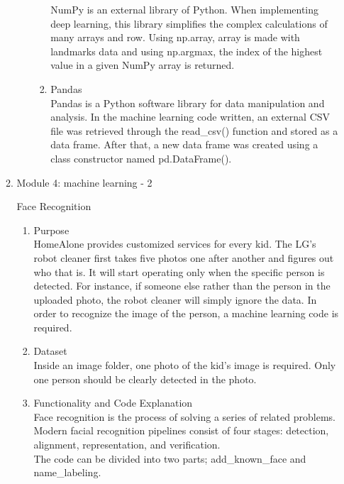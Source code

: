 \documentclass[conference]{IEEEtran}
\begin{document}
\begin{enumerate}[label=\arabic*.]
\begin{enumerate}[label=\arabic*.]
\begin{enumerate}[label=\alph*.]
\begin{enumerate}[label=\roman*.]
            NumPy is an external library of Python. When implementing deep learning, this library simplifies the complex calculations of many arrays and row. Using np.array, array is made with landmarks data and using np.argmax, the index of the highest value in a given NumPy array is returned. \\
            \item{\large{Pandas}}\\ 
            Pandas is a Python software library for data manipulation and analysis. In the machine learning code written, an external CSV file was retrieved through the read\_csv() function and stored as a data frame. After that, a new data frame was created using a class constructor named pd.DataFrame(). \\
        \end{enumerate}
    \end{enumerate}
    \item {\large{Module 4: machine learning - 2}} \\
    \begin{center}\large{Face Recognition}\\\end{center} 
    \begin{enumerate}[label=\alph*.]
        \item{\large{Purpose}}\\
        HomeAlone provides customized services for every kid. The LG’s robot cleaner first takes five photos one after another and figures out who that is. It will start operating only when the specific person is detected. For instance, if someone else rather than the person in the uploaded photo, the robot cleaner will simply ignore the data. In order to recognize the image of the person, a machine learning code is required. \\
        \item{\large{Dataset}}\\
        Inside an image folder, one photo of the kid’s image is required. Only one person should be clearly detected in the photo. \\
        \item{\large{Functionality and Code Explanation}}\\
        Face recognition is the process of solving a series of related problems. Modern facial recognition pipelines consist of four stages: detection, alignment, representation, and verification.\\
        The code can be divided into two parts; add\_known\_face and name\_labeling. \\

\end{enumerate}
\end{enumerate}
\end{enumerate}
\end{document}
